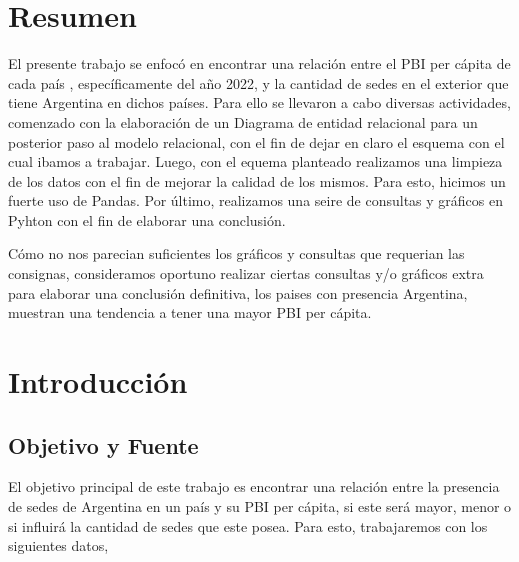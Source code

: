 \documentclass[10pt,a4paper]{article}
\begin{document}

\maketitle

\restoregeometry


\section{Resumen} \vspace{0.3cm}

El presente trabajo se enfocó en encontrar  una relación entre el PBI per cápita de cada país , específicamente del año 2022, y la cantidad de sedes en el exterior que tiene Argentina en dichos países.
Para ello se llevaron a cabo diversas actividades, comenzado con  la  elaboración de un Diagrama de entidad relacional para un posterior paso al modelo relacional, con el fin de dejar en claro el esquema con el cual ibamos a trabajar. Luego, con el equema planteado realizamos una limpieza de los datos con el fin de mejorar la calidad de los mismos. Para esto, hicimos un fuerte uso de Pandas. Por último, realizamos una seire de consultas y gráficos en Pyhton con el fin de elaborar una conclusión. \par
Cómo no nos parecian suficientes los gráficos y consultas que requerian las consignas, consideramos oportuno realizar ciertas consultas y/o gráficos extra para elaborar una conclusión definitiva, los paises con presencia Argentina, muestran una tendencia a tener una mayor PBI per cápita. 

\section{Introducción} \vspace{0.1cm}

\subsection{Objetivo y Fuente} \vspace{0.3cm}

El objetivo principal de este trabajo es encontrar una relación entre la presencia de sedes de Argentina en un país y su PBI per cápita, si este será mayor, menor o si influirá la cantidad de sedes que este posea.  Para esto, trabajaremos con los siguientes datos, 
\end{document}
